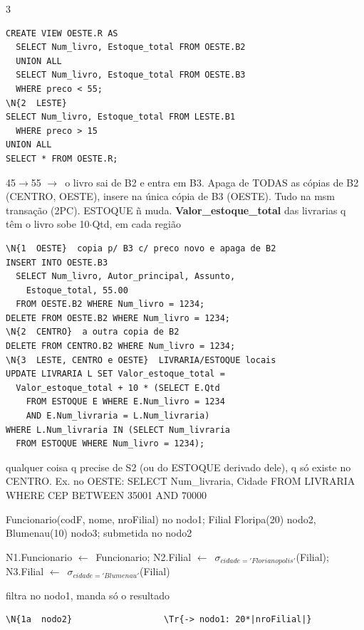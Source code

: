 \documentclass[a4paper]{article}
\newenvironment{dl}{\begin{description}[leftmargin=3.2mm,labelindent=0pt,itemsep=0.7pt,topsep=0.6pt,font=\color{tm}\bfseries,style=standard]}{\end{description}}
\newcommand{\sub}[1]{\par\vspace{1.4pt}{\color{hd}\bfseries\underline{#1}}\par}
\newcommand{\at}[1]{{\color{wr}\bfseries #1}}
\newcommand{\go}{$\rightarrow$}
\newcommand{\la}{$\leftarrow$}
\newcommand{\q}[1]{{\ttfamily #1}}
\newcommand{\sel}{$\sigma$}
\newcommand{\N}[1]{\textcolor{nd}{\textbf{#1}}}
\newcommand{\Tr}[1]{\textcolor{tr}{#1}}
\begin{document}
\begin{multicols*}{3}
\begin{sql}
\begin{Verbatim}
CREATE VIEW OESTE.R AS
  SELECT Num_livro, Estoque_total FROM OESTE.B2
  UNION ALL
  SELECT Num_livro, Estoque_total FROM OESTE.B3
  WHERE preco < 55;
\N{2  LESTE}
SELECT Num_livro, Estoque_total FROM LESTE.B1
  WHERE preco > 15
UNION ALL
SELECT * FROM OESTE.R;
\end{Verbatim}
\end{sql}
\begin{dl}
\item[b)] 45\go 55 \go\ o livro sai de B2 e entra em B3. Apaga de TODAS as cópias de B2 (CENTRO, OESTE), insere na única cópia de B3 (OESTE). Tudo na msm transação (2PC). ESTOQUE ñ muda. \at{Valor\_estoque\_total} das livrarias q têm o livro sobe 10$\cdot$Qtd, em cada região
\end{dl}
\begin{sql}
\begin{Verbatim}
\N{1  OESTE}  copia p/ B3 c/ preco novo e apaga de B2
INSERT INTO OESTE.B3
  SELECT Num_livro, Autor_principal, Assunto,
    Estoque_total, 55.00
  FROM OESTE.B2 WHERE Num_livro = 1234;
DELETE FROM OESTE.B2 WHERE Num_livro = 1234;
\N{2  CENTRO}  a outra copia de B2
DELETE FROM CENTRO.B2 WHERE Num_livro = 1234;
\N{3  LESTE, CENTRO e OESTE}  LIVRARIA/ESTOQUE locais
UPDATE LIVRARIA L SET Valor_estoque_total =
  Valor_estoque_total + 10 * (SELECT E.Qtd
    FROM ESTOQUE E WHERE E.Num_livro = 1234
    AND E.Num_livraria = L.Num_livraria)
WHERE L.Num_livraria IN (SELECT Num_livraria
  FROM ESTOQUE WHERE Num_livro = 1234);
\end{Verbatim}
\end{sql}
\begin{dl}
\item[c)] qualquer coisa q precise de S2 (ou do ESTOQUE derivado dele), q só existe no CENTRO. Ex. no OESTE: \q{SELECT Num\_livraria, Cidade FROM LIVRARIA WHERE CEP BETWEEN 35001 AND 70000}
\end{dl}
\sub{4.3} Funcionario(codF, nome, nroFilial) no nodo1; Filial Floripa(20) nodo2, Blumenau(10) nodo3; submetida no nodo2
\begin{dl}
\item[a)] \q{N1.Funcionario} \la\ Funcionario; \q{N2.Filial} \la\ \sel$_{cidade='Florianopolis'}$(Filial); \q{N3.Filial} \la\ \sel$_{cidade='Blumenau'}$(Filial)
\item[b) Alt1:] filtra no nodo1, manda só o resultado
\end{dl}
\begin{sql}
\begin{Verbatim}
\N{1a  nodo2}                  \Tr{-> nodo1: 20*|nroFilial|}

\end{Verbatim}
\end{sql}
\end{multicols*}
\end{document}
